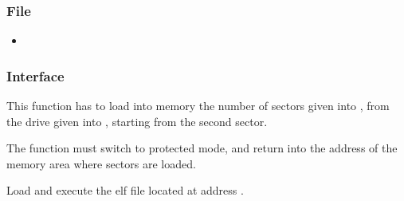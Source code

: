 \subsubsection*{File}
\begin{itemize}
  \item {}
\end{itemize}

\subsubsection*{Interface}

{
  This function has to load into memory the number of sectors given into
  , from the drive given into , starting from
  the second sector.

  The function must switch to protected mode, and return into 
  the address of the memory area where sectors are loaded.
}

{
  Load and execute the elf file located at address .
}
